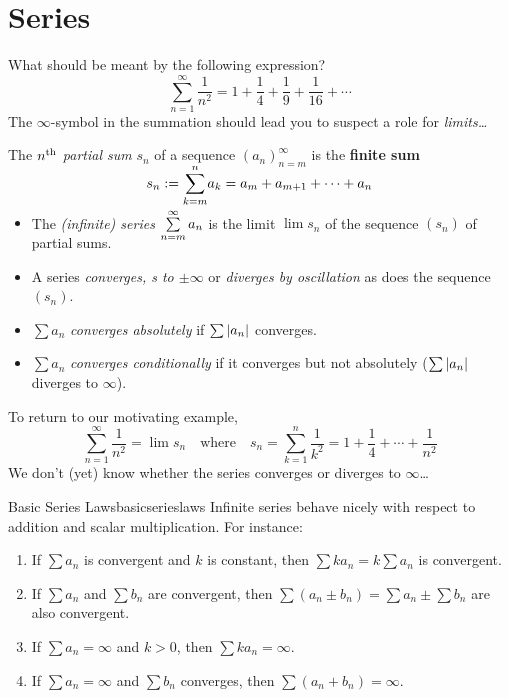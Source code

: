 \graphicspath{{3series/asy/}}

\thispagestyle{empty}

\setcounter{section}{13}
\section{Series}\label{sec:series}


What should be meant by the following expression?
\[
	\sum_{n=1}^\infty \frac 1{n^2}=1+\frac 14+\frac 19+\frac 1{16}+\cdots
\]
The \emph{$\infty$}-symbol in the summation should lead you to suspect a role for \emph{limits\ldots}

\begin{defn}{}{}
	The \emph{$n\textsuperscript{th}$ partial sum} $s_n$ of a sequence $(a_n)_{n=m}^\infty$ is the \textbf{finite sum}
	\[
		s_n:=\smash{\sum_{k=m}^n}a_k=a_m+a_{m+1}+\cdots+a_n
	\]
	\begin{itemize}
	  \item The \emph{(infinite) series}\footnotemark{} $\smash[b]{\sum\limits_{n=m}^\infty a_n}$ is the limit $\lim s_n$ of the sequence $(s_n)$ of partial sums.
	  \item A series \emph{converges, s to $\pm\infty$} or \emph{diverges by oscillation} as does the sequence $(s_n)$.
	  \item $\sum a_n$ \emph{converges absolutely} if $\sum\left| a_n\right|$ converges.
	  \item $\sum a_n$ \emph{converges conditionally} if it converges but not absolutely ($\sum \left| a_n\right|$ diverges to $\infty$).
	\end{itemize}
\end{defn}


To return to our motivating example,
\[
	\sum_{n=1}^\infty \frac 1{n^2}=\lim s_n\quad\text{where}\quad s_n=\sum\limits_{k=1}^n \frac 1{k^2}=1+\frac 14+\cdots+\frac 1{n^2}
\]
We don't (yet) know whether the series converges or diverges to $\infty$\ldots

\begin{thm}{Basic Series Laws}{basicserieslaws}
	Infinite series behave nicely with respect to addition and scalar multiplication. For instance:
	\begin{enumerate}
	  \item If $\sum a_n$ is convergent and $k$ is constant, then $\sum ka_n=k\sum a_n$ is convergent.
	  \item If $\sum a_n$ and $\sum b_n$ are convergent, then $\sum(a_n\pm b_n)=\sum a_n\pm\sum b_n$ are also convergent.
	  \item If $\sum a_n=\infty$ and $k>0$, then $\sum ka_n=\infty$.
	  \item If $\sum a_n=\infty$ and $\sum b_n$ converges, then $\sum(a_n+b_n)=\infty$.
	\end{enumerate}
\end{thm}

